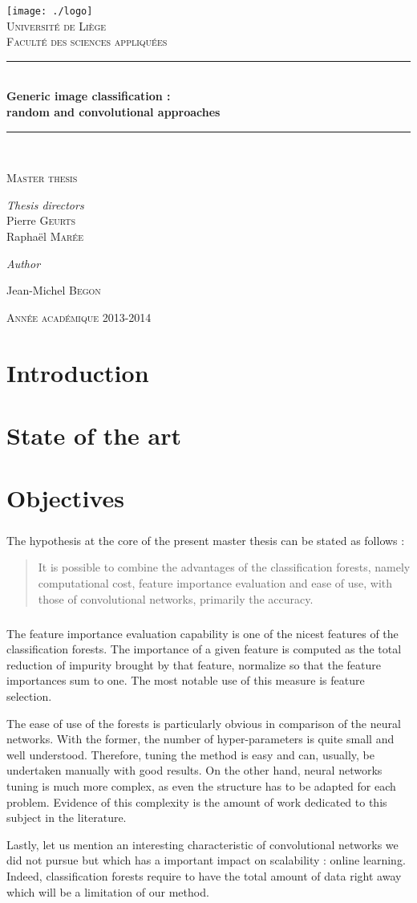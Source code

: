\documentclass[a4paper]{report}
\newlength{\larg}
\newcommand{\titleg}{
  \begin{titlepage}
  \begin{center}

  \bigskip
  \bigskip
  \bigskip
  \bigskip
  \bigskip


  \texttt{[image: ./logo]}\\[1cm]
  \smallskip
  \textsc{\LARGE Université de Liège}\\
  \smallskip
  \textsc{Faculté des sciences appliquées}\\

  \bigskip



  \rule{\columnwidth}{1pt} \\[0.4cm] 
  { \huge \bfseries Generic image classification : \\ \bigskip random and convolutional approaches}\\[0.4cm]
  \rule{\columnwidth}{1pt} \\[0.2cm]



  \begin{minipage}{0.7\textwidth} 
  \begin{center} \large 
  \textsc{Master thesis}
  \end{center} \end{minipage}

  \vfill


  \begin{minipage}{0.7\textwidth} \begin{center}
  \textit{Thesis directors} \\
  \large Pierre \textsc{Geurts} \\
  \large Raphaël \textsc{Marée} 
  \end{center} \end{minipage} 

  \bigskip
  \bigskip
  \bigskip

  \textit{Author} \\
  \begin{minipage}{0.7\textwidth} \begin{center}
  \large Jean-Michel \textsc{Begon}
  \end{center} \end{minipage} 
  


  \bigskip
  \bigskip
  \bigskip

  \textsc{Année académique 2013-2014}
  \end{center}
  \end{titlepage}
}
\begin{document}
\titleg
\thispagestyle{empty}
\newpage

\pagestyle{fancy}
\lhead{}
\chead{}
\rhead{\itshape \textcolor{gris}{Image classification with extremely randomized trees}}
\lfoot{\itshape \textcolor{gris}{a new feature extraction scheme}}
\cfoot{}
\rfoot{\itshape \textcolor{gris}{\thepage}}
\renewcommand{\headrulewidth}{0.4pt}
\renewcommand{\footrulewidth}{0.4pt}

\newpage 


\tableofcontents

\chapter{Introduction}

\chapter{State of the art}

\chapter{Objectives}
\paragraph{}
The hypothesis at the core of the present master thesis can be stated as follows : 
\begin{quote}
It is possible to combine the advantages of the classification forests, namely computational cost, feature importance evaluation and ease of use, with those of convolutional networks, primarily the accuracy.
\end{quote}
\paragraph{}
The feature importance evaluation capability is one of the nicest features of the classification forests. The importance of a given feature is computed as the total reduction of impurity brought by that feature, normalize so that the feature importances sum to one. The most notable use of this measure is feature selection. 
\par
The ease of use of the forests is particularly obvious in comparison of the neural networks. With the former, the number of hyper-parameters is quite small and well understood. Therefore, tuning the method is easy and can, usually, be undertaken manually with good results. On the other hand, neural networks tuning is much more complex, as even the structure has to be adapted for each problem. Evidence of this complexity is the amount of work dedicated to this subject in the literature. %
\par
Lastly, let us mention an interesting characteristic of convolutional networks we did not pursue but which has a important impact on scalability : online learning. Indeed, classification forests require to have the total amount of data right away which will be a limitation of our method.
\end{document}
